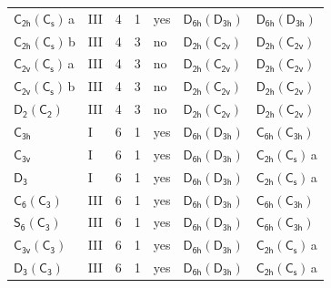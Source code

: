 \documentclass[10pt,a4paper]{article}
\numberwithin{equation}{section}
\newcommand{\grp}[1]{\mathsf{#1}}
\newcommand{\clsletter}[1]{\,{\scriptsize\color{black!55}#1}}
\begin{document}
{\begin{longtable}{@{}llrrlll@{}}
\href{C2h-C1v.pdf}{$\grp{C_{2h}}(\grp{C_{s}})$}\clsletter{a} & III & 4 & 1 & yes & \href{D6h-D3h.pdf}{$\grp{D_{6h}}(\grp{D_{3h}})$} & \href{D6h-D3h.pdf}{$\grp{D_{6h}}(\grp{D_{3h}})$}\\
\href{C2h-C1v.pdf}{$\grp{C_{2h}}(\grp{C_{s}})$}\clsletter{b} & III & 4 & 3 & no & \href{D2h-C2v.pdf}{$\grp{D_{2h}}(\grp{C_{2v}})$} & \href{D2h-C2v.pdf}{$\grp{D_{2h}}(\grp{C_{2v}})$}\\
\href{C2v-C1v.pdf}{$\grp{C_{2v}}(\grp{C_{s}})$}\clsletter{a} & III & 4 & 3 & no & \href{D2h-C2v.pdf}{$\grp{D_{2h}}(\grp{C_{2v}})$} & \href{D2h-C2v.pdf}{$\grp{D_{2h}}(\grp{C_{2v}})$}\\
\href{C2v-C1v.pdf}{$\grp{C_{2v}}(\grp{C_{s}})$}\clsletter{b} & III & 4 & 3 & no & \href{D2h-C2v.pdf}{$\grp{D_{2h}}(\grp{C_{2v}})$} & \href{D2h-C2v.pdf}{$\grp{D_{2h}}(\grp{C_{2v}})$}\\
\href{D2-C2.pdf}{$\grp{D_{2}}(\grp{C_{2}})$} & III & 4 & 3 & no & \href{D2h-C2v.pdf}{$\grp{D_{2h}}(\grp{C_{2v}})$} & \href{D2h-C2v.pdf}{$\grp{D_{2h}}(\grp{C_{2v}})$}\\
\href{../../../rotation/data/pdf/C3h.pdf}{$\grp{C_{3h}}$} & I & 6 & 1 & yes & \href{D6h-D3h.pdf}{$\grp{D_{6h}}(\grp{D_{3h}})$} & \href{C6h-C3h.pdf}{$\grp{C_{6h}}(\grp{C_{3h}})$}\\
\href{../../../rotation/data/pdf/C3v.pdf}{$\grp{C_{3v}}$} & I & 6 & 1 & yes & \href{D6h-D3h.pdf}{$\grp{D_{6h}}(\grp{D_{3h}})$} & \href{C2h-C1v.pdf}{$\grp{C_{2h}}(\grp{C_{s}})$}\clsletter{a}\\
\href{../../../rotation/data/pdf/D3.pdf}{$\grp{D_{3}}$} & I & 6 & 1 & yes & \href{D6h-D3h.pdf}{$\grp{D_{6h}}(\grp{D_{3h}})$} & \href{C2h-C1v.pdf}{$\grp{C_{2h}}(\grp{C_{s}})$}\clsletter{a}\\
\href{C6-C3.pdf}{$\grp{C_{6}}(\grp{C_{3}})$} & III & 6 & 1 & yes & \href{D6h-D3h.pdf}{$\grp{D_{6h}}(\grp{D_{3h}})$} & \href{C6h-C3h.pdf}{$\grp{C_{6h}}(\grp{C_{3h}})$}\\
\href{S6-C3.pdf}{$\grp{S_{6}}(\grp{C_{3}})$} & III & 6 & 1 & yes & \href{D6h-D3h.pdf}{$\grp{D_{6h}}(\grp{D_{3h}})$} & \href{C6h-C3h.pdf}{$\grp{C_{6h}}(\grp{C_{3h}})$}\\
\href{C3v-C3.pdf}{$\grp{C_{3v}}(\grp{C_{3}})$} & III & 6 & 1 & yes & \href{D6h-D3h.pdf}{$\grp{D_{6h}}(\grp{D_{3h}})$} & \href{C2h-C1v.pdf}{$\grp{C_{2h}}(\grp{C_{s}})$}\clsletter{a}\\
\href{D3-C3.pdf}{$\grp{D_{3}}(\grp{C_{3}})$} & III & 6 & 1 & yes & \href{D6h-D3h.pdf}{$\grp{D_{6h}}(\grp{D_{3h}})$} & \href{C2h-C1v.pdf}{$\grp{C_{2h}}(\grp{C_{s}})$}\clsletter{a}\\

\end{longtable}}
\end{document}
